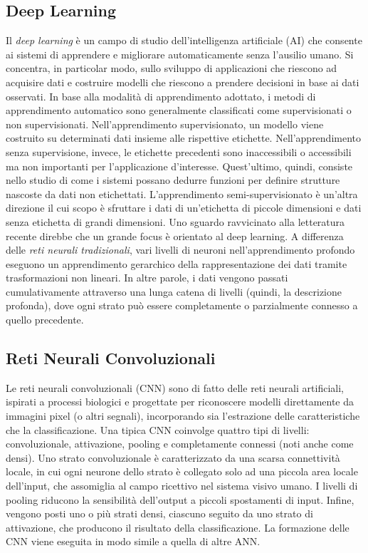 {\subsection{Deep Learning}
Il \textit{deep learning} è un campo di studio dell'intelligenza artificiale (AI) che consente ai sistemi di apprendere e migliorare automaticamente senza l'ausilio umano. Si concentra, in particolar modo, sullo sviluppo di applicazioni che riescono ad acquisire dati e costruire modelli che riescono a prendere decisioni in base ai dati osservati.
\newline
In base alla modalità di apprendimento adottato, i metodi di apprendimento automatico sono generalmente classificati come supervisionati o non supervisionati. Nell'apprendimento supervisionato, un modello viene costruito su determinati dati insieme alle rispettive etichette. 
\newline
Nell'apprendimento senza supervisione, invece, le etichette precedenti sono inaccessibili o accessibili ma non importanti per l'applicazione d'interesse.
Quest'ultimo, quindi, consiste nello studio di come i sistemi possano dedurre funzioni per definire strutture nascoste da dati non etichettati.
\newline
L'apprendimento semi-supervisionato è un'altra direzione il cui scopo è sfruttare i dati di un'etichetta di piccole dimensioni e dati senza etichetta di grandi dimensioni.
Uno sguardo ravvicinato alla letteratura recente direbbe che un grande focus è orientato al deep learning.
\newline
A differenza delle \textit{reti neurali tradizionali}, vari livelli di neuroni nell'apprendimento profondo eseguono un apprendimento gerarchico della rappresentazione dei dati tramite trasformazioni non lineari. In altre parole, i dati vengono passati cumulativamente attraverso una lunga catena di livelli (quindi, la descrizione profonda), dove ogni strato può essere completamente o parzialmente connesso a quello precedente.
\newpage
\subsection{Reti Neurali Convoluzionali}
Le reti neurali convoluzionali (CNN) sono di fatto delle reti neurali artificiali, ispirati a processi biologici e progettate per riconoscere modelli direttamente da immagini pixel (o altri segnali), incorporando sia l'estrazione delle caratteristiche che la classificazione.
\newline
Una tipica CNN coinvolge quattro tipi di livelli: convoluzionale, attivazione, pooling e completamente connessi (noti anche come densi). 
\newline
Uno strato convoluzionale è caratterizzato da una scarsa connettività locale, in cui ogni neurone dello strato è collegato solo ad una piccola area locale dell'input, che assomiglia al campo ricettivo nel sistema visivo umano.
\newline
I livelli di pooling riducono la sensibilità dell'output a piccoli spostamenti di input. Infine, vengono posti uno o più strati densi, ciascuno seguito da uno strato di attivazione, che producono il risultato della classificazione. La formazione delle CNN viene eseguita in modo simile a quella di altre ANN. \cite{anthimopoulos2016lung}

}
